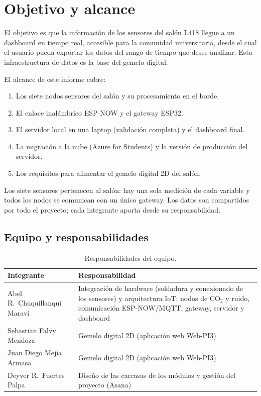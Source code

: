 \documentclass[11pt,a4paper]{article}
\begin{document}
\tableofcontents
\newpage

\section{Objetivo y alcance}

El objetivo es que la informaci\'on de los sensores del sal\'on L418 llegue a un
dashboard en tiempo real, accesible para la comunidad universitaria, desde el cual el
usuario pueda exportar los datos del rango de tiempo que desee analizar. Esta
infraestructura de datos es la base del gemelo digital.

El alcance de este informe cubre:
\begin{enumerate}
  \item Los siete nodos sensores del sal\'on y su procesamiento en el borde.
  \item El enlace inal\'ambrico ESP-NOW y el gateway ESP32.
  \item El servidor local en una laptop (validaci\'on completa) y el dashboard final.
  \item La migraci\'on a la nube (Azure for Students) y la versi\'on de producci\'on del servidor.
  \item Los requisitos para alimentar el gemelo digital 2D del sal\'on.
\end{enumerate}

Los siete sensores pertenecen al sal\'on: hay una sola medici\'on de cada variable y todos
los nodos se comunican con un \'unico gateway. Los datos son compartidos por todo el
proyecto; cada integrante aporta desde su responsabilidad.

\subsection{Equipo y responsabilidades}

\begin{table}[H]
\centering
\caption{Responsabilidades del equipo.}
\begin{tabularx}{\textwidth}{@{}lX@{}}
\toprule
\textbf{Integrante} & \textbf{Responsabilidad} \\
\midrule
Abel R.\ Chuquillanqui Marav\'i & Integraci\'on de hardware (soldadura y conexionado de los sensores) y arquitectura IoT: nodos de CO$_2$ y ruido, comunicaci\'on ESP-NOW/MQTT, gateway, servidor y dashboard \\
Sebastian Falvy Mendoza & Gemelo digital 2D (aplicaci\'on web Web-PI3) \\
Juan Diego Mej\'ia Armasa & Gemelo digital 2D (aplicaci\'on web Web-PI3) \\
Deyver R.\ Fuertes Palpa & Dise\~no de las carcasas de los m\'odulos y gesti\'on del proyecto (Asana) \\
\bottomrule
\end{tabularx}
\end{table}
\end{document}
